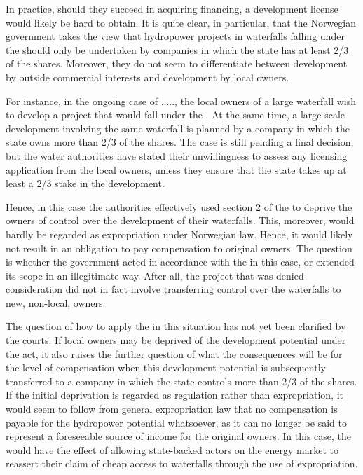 In practice, should they succeed in acquiring financing, a development license would likely be hard to obtain. It is quite clear, in particular, that the Norwegian government takes the view that hydropower projects in waterfalls falling under the \cite{ica17} should only be undertaken by companies in which the state has at least 2/3 of the shares. Moreover, they do not seem to differentiate between development by outside commercial interests and development by local owners. 

For instance, in the ongoing case of ....., the local owners of a large waterfall wish to develop a project that would fall under the \cite{ica17}. At the same time, a large-scale development involving the same waterfall is planned by a company in which the state owns more than 2/3 of the shares. The case is still pending a final decision, but the water authorities have stated their unwillingness to assess any licensing application from the local owners, unless they ensure that the state takes up at least a 2/3 stake in the development.

Hence, in this case the authorities effectively used section 2 of the \cite{ica17} to deprive the owners of control over the development of their waterfalls. This, moreover, would hardly be regarded as expropriation under Norwegian law. Hence, it would likely not result in an obligation to pay compensation to original owners. The question is whether the government acted in accordance with the \cite{ica17} in this case, or extended its scope in an illegitimate way. After all, the project that was denied consideration did not in fact involve transferring control over the waterfalls to new, non-local, owners. 

The question of how to apply the \cite{ica17} in this situation has not yet been clarified by the courts. If local owners may be deprived of the development potential under the act, it also raises the further question of what the consequences will be for the level of compensation when this development potential is subsequently transferred to a company in which the state controls more than 2/3 of the shares. If the initial deprivation is regarded as regulation rather than expropriation, it would seem to follow from general expropriation law that no compensation is payable for the hydropower potential whatsoever, as it can no longer be said to represent a foreseeable source of income for the original owners. In this case, the \cite{ica17} would have the effect of allowing state-backed actors on the energy market to reassert their claim of cheap access to waterfalls through the use of expropriation.

